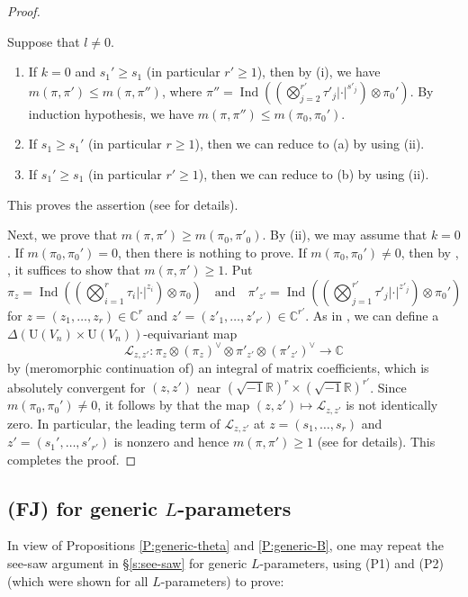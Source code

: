 \documentclass[11pt]{amsart}
\numberwithin{equation}{section}
\theoremstyle{plain}
\theoremstyle{definition}
\theoremstyle{remark}
\def\Ind{\operatorname{Ind}}
\def\U{\mathrm{U}}
\def\CC{\mathbb{C}}
\def\RR{\mathbb{R}}
\begin{document}
\begin{proof}
\begin{enumerate}
Suppose that $l \ne 0$.
\begin{enumerate}
 \item If $k=0$ and $s_1' \ge s_1$ (in particular $r'\ge 1$), then by (i), we have $m(\pi, \pi') \le m(\pi, \pi'')$, where $\pi'' = \Ind((\bigotimes_{j=2}^{r'} \tau'_j |\cdot|^{s'_j}) \otimes \pi_0')$.
 By induction hypothesis, we have $m(\pi, \pi'') \le m(\pi_0, \pi_0')$.
 \item If $s_1 \ge s_1'$ (in particular $r \ge 1$), then we can reduce to (a) by using (ii).
 \item If $s_1' \ge s_1$ (in particular $r' \ge 1$), then we can reduce to (b) by using (ii).
\end{enumerate}
This proves the assertion (see \cite[\S 1.6]{mw} for details).
\end{enumerate}

Next, we prove that $m(\pi, \pi') \ge m(\pi_0, \pi'_0)$.
By (ii), we may assume that $k=0$.
If $m(\pi_0, \pi_0') = 0$, then there is nothing to prove.
If $m(\pi_0, \pi_0') \ne 0$, then by \cite{agrs}, \cite[Corollary 15.3]{ggp1}, it suffices to show that $m(\pi, \pi') \ge 1$.
Put
\[
 \pi_z = \Ind ((\bigotimes_{i=1}^r \tau_i |\cdot|^{z_i}) \otimes \pi_0)
 \quad \text{and} \quad
 \pi'_{z'} = \Ind ((\bigotimes_{j=1}^{r'} \tau'_j |\cdot|^{z'_j}) \otimes \pi_0')
\]
for $z = (z_1, \dots, z_r) \in \CC^r$ and $z' = (z'_1, \dots, z'_{r'}) \in \CC^{r'}$.
As in \cite[Lemme 1.7]{mw}, we can define a $\Delta(\U(V_n) \times \U(V_n))$-equivariant map
\[
 \mathcal{L}_{z,z'} : \pi_z \otimes (\pi_z)^\vee \otimes \pi'_{z'} \otimes (\pi'_{z'})^\vee \longrightarrow \CC
\]
by (meromorphic continuation of) an integral of matrix coefficients, which is absolutely convergent for $(z, z')$ near $(\sqrt{-1} \RR)^r \times (\sqrt{-1} \RR)^{r'}$.
Since $m(\pi_0, \pi_0') \ne 0$, it follows by \cite[Th\'eor\`eme 14.3.1, Proposition 15.2.1, Proposition 15.3.1]{bp3} that the map $(z, z') \mapsto \mathcal{L}_{z, z'}$ is not identically zero.
In particular, the leading term of $\mathcal{L}_{z,z'}$ at $z = (s_1, \dots, s_r)$ and $z' = (s_1', \dots, s'_{r'})$ is nonzero and hence $m(\pi, \pi') \ge 1$ (see \cite[\S 1.8]{mw} for details).
This completes the proof.
\end{proof}

\subsection{(FJ) for generic $L$-parameters}

In view of Propositions \ref{P:generic-theta} and \ref{P:generic-B}, one may repeat the see-saw argument in \S \ref{s:see-saw} for generic $L$-parameters, using (P1) and (P2) (which were shown for all $L$-parameters) to prove:
\end{document}
